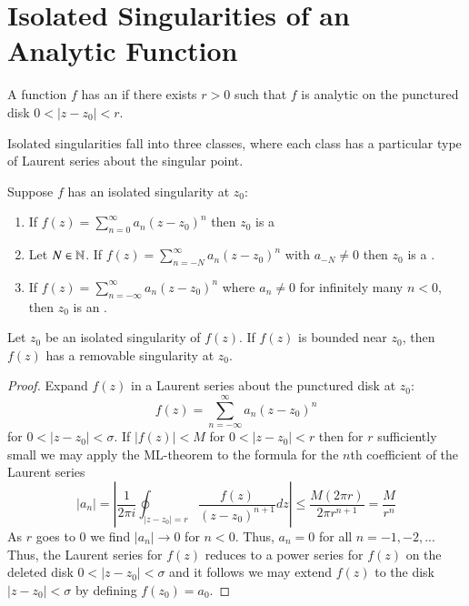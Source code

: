 \section{Isolated Singularities of an Analytic Function}


\begin{definition}
    A function $f$ has an  if there exists $r > 0$ such that $f$ is analytic on the punctured disk $0 < |z-z_0| < r$.
\end{definition}


Isolated singularities fall into three classes, where each class has a particular type of Laurent series about the singular point.

\begin{definition}
    Suppose $f$ has an isolated singularity at $z_0$: \begin{enumerate}
        \item If $f(z) = \sum_{n=0}^{\infty}a_n(z-z_0)^n$ then $z_0$ is a 
        \item Let $N \in \mathbb N$. If $f(z) = \sum_{n=-N}^{\infty}a_n(z-z_0)^n$ with $a_{-N} \neq 0$ then $z_0$ is a .
        \item If $f(z) = \sum_{n=-\infty}^{\infty}a_n(z-z_0)^n$ where $a_n \neq 0$ for infinitely many $n < 0$, then $z_0$ is an .
    \end{enumerate}
\end{definition}


\begin{theorem}
    Let $z_0$ be an isolated singularity of $f(z)$. If $f(z)$ is bounded near $z_0$, then $f(z)$ has a removable singularity at $z_0$.
\end{theorem}
\begin{proof}
    Expand $f(z)$ in a Laurent series about the punctured disk at $z_0$: \begin{equation*}
        f(z) = \sum_{n=-\infty}^{\infty}a_n(z-z_0)^n
    \end{equation*}
    for $0 < |z-z_0| < \sigma$. If $|f(z)| < M$ for $0 < |z-z_0| < r$ then for $r$ sufficiently small we may apply the ML-theorem to the formula for the $n$th coefficient of the Laurent series \begin{equation*}
        |a_n| = \left|\frac{1}{2\pi i}\oint_{|z-z_0|=r}\frac{f(z)}{(z-z_0)^{n+1}}dz\right| \leq \frac{M(2\pi r)}{2\pi r^{n+1}} = \frac{M}{r^n}
    \end{equation*}
    As $r$ goes to $0$ we find $|a_n|\rightarrow 0$ for $n < 0$. Thus, $a_n = 0$ for all $n  = -1,-2,...$ Thus, the Laurent series for $f(z)$ reduces to a power series for $f(z)$ on the deleted disk $0 < |z-z_0| < \sigma$ and it follows we may extend $f(z)$ to the disk $|z-z_0| < \sigma$ by defining $f(z_0) = a_0$.
\end{proof}



